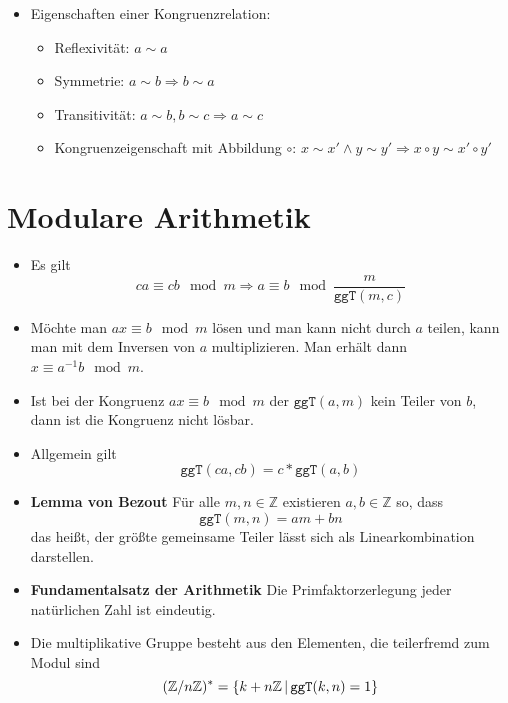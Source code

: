 \documentclass[landscape, 8pt, a4paper]{extarticle}
\newcommand{\ggT}{\texttt{ggT}}
\newcommand{\Z}{\mathbb{Z}}
\newcommand{\set}[2]{\ensuremath\left\{ #1 \,\middle|\, #2 \right\}}
\begin{document}
\begin{multicols}{3}
\begin{itemize}
		
		\item Eigenschaften einer Kongruenzrelation:%
		\begin{itemize}%
			\item Reflexivität: $a\sim a$
			\item Symmetrie: $a\sim b\Rightarrow b\sim a$
			\item Transitivität: $a\sim b, b\sim c\Rightarrow a\sim c$
			\item Kongruenzeigenschaft mit Abbildung $\circ$: $x\sim x'\wedge y\sim y'\Rightarrow x\circ y\sim x'\circ y'$ 
		\end{itemize}

	\end{itemize}


	\section{Modulare Arithmetik}
	\begin{itemize}
		\item Es gilt
		\begin{equation*}
			ca\equiv cb\mod m\Rightarrow a\equiv b\mod \frac{m}{\ggT(m,c)}
		\end{equation*}
		\item Möchte man $ax\equiv b\mod m$ lösen und man kann nicht durch $a$ teilen, kann man mit dem Inversen von $a$ multiplizieren. Man erhält dann $x\equiv a^{-1}b\mod m$.

		\item Ist bei der Kongruenz $ax\equiv b \mod m$ der $\ggT(a,m)$ kein Teiler von $b$, dann ist die Kongruenz nicht lösbar.

		\item Allgemein gilt
		\begin{equation*}
			\ggT(ca,cb)=c*\ggT(a,b)
		\end{equation*}
		\item \textbf{Lemma von Bezout}
		Für alle $m,n\in\Z$ existieren $a,b\in\Z$ so, dass
		\begin{equation*}
			\ggT(m,n)=am+bn
		\end{equation*}
		das heißt, der größte gemeinsame Teiler lässt sich als Linearkombination darstellen.
		\item \textbf{Fundamentalsatz der Arithmetik} Die Primfaktorzerlegung jeder natürlichen Zahl ist eindeutig.
		\item Die multiplikative Gruppe besteht aus den Elementen, die teilerfremd zum Modul sind
		\begin{equation*}
			(\Z/n\Z)^\ast =\set{k+n\Z}{\ggT(k,n)=1}
		\end{equation*}


\end{itemize}
\end{multicols}
\end{document}
